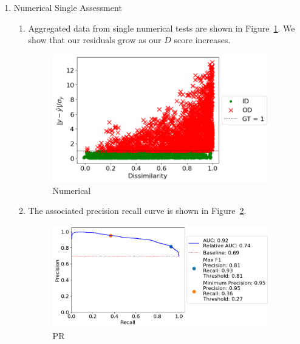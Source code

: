 \begin{enumerate}
\begin{enumerate}
    \end{enumerate}
    
    \item Numerical Single Assessment

    \begin{enumerate}

        \item Aggregated data from single numerical tests are shown in Figure~\ref{diffusion_single}. We show that our residuals grow as our $D$ score increases.

        \begin{figure}[H]
        \centering
        \includegraphics[width=0.95\textwidth]{figures/diffusion_single.png}
        \caption{Numerical}
        \label{diffusion_single}
        \end{figure}

        \item The associated precision recall curve is shown in Figure~\ref{diffusion_single_pr}.

        \begin{figure}[H]
        \centering
        \includegraphics[width=0.95\textwidth]{figures/diffusion_single_pr.png}
        \caption{PR}
        \label{diffusion_single_pr}
        \end{figure}
    \end{enumerate}


\end{enumerate}
